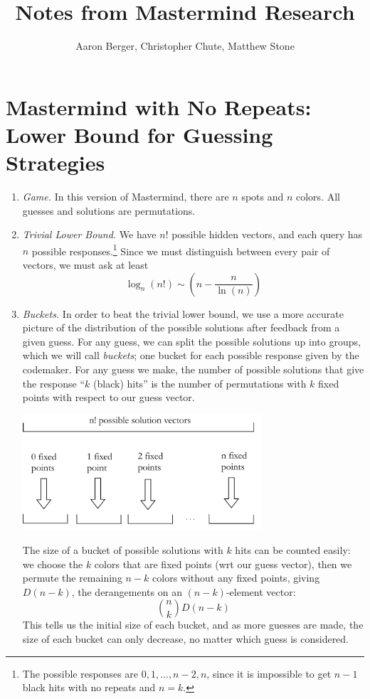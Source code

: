 \documentclass[12pt, a4paper]{article}
\author{Aaron Berger, Christopher Chute, Matthew Stone}
\title{Notes from Mastermind Research}
\begin{document}
\section*{Mastermind with No Repeats: Lower Bound for Guessing Strategies}
	\begin{enumerate}
	\item\textit{Game.}
	In this version of Mastermind, there are $n$ spots and $n$ colors.
	All guesses and solutions are permutations.
	
	\item \textit{Trivial Lower Bound.}
	We have $n!$ possible hidden vectors, and each query has $n$ possible
	responses.\footnote{The possible responses are $0, 1, \ldots, n-2, n$, since it is
	impossible to get $n-1$ black hits with no repeats and $n=k$.}
	Since we must distinguish between every pair of vectors, we must ask at least
		\begin{equation*}
		\log_{n}(n!)\sim \left(n-\frac{n}{\ln(n)}\right)
		\end{equation*}

	\item\textit{Buckets.}
	In order to beat the trivial lower bound, we use a more accurate picture
	of the distribution of the possible solutions after feedback from a given guess.
	For any guess, we can split the possible solutions up into groups, which
	we will call \textit{buckets}; one bucket for each possible response given by
	the codemaker. For any guess we make, the number of possible solutions that give
	the response ``$k$ (black) hits'' is the number of permutations with $k$ fixed
	points with respect to our guess vector.
	\begin{center}
	\includegraphics[keepaspectratio=true, width=0.7\textwidth]{buckets}
	\end{center}
	The size of a bucket of possible
	solutions with $k$ hits can be counted easily: we choose the $k$ colors that are
	fixed points (wrt our guess vector), then we permute the remaining $n-k$ colors
	without any fixed points, giving $D(n - k)$, the derangements on an $(n-k)$-element
	vector:
		\begin{equation*}
		\binom{n}{k}D(n-k)
		\end{equation*}
	This tells us the initial size of each bucket, and as more guesses are
	made, the size of each bucket can only decrease, no matter which guess is
	considered.
	

\end{enumerate}
\end{document}
